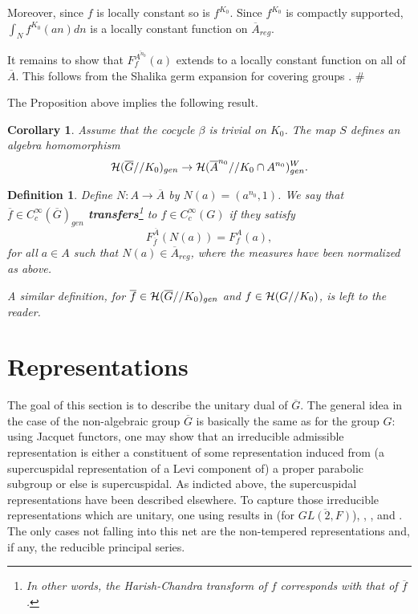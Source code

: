 \documentclass[twocolumn,10pt]{article}
\newtheorem{corollary}[theorem]{Corollary}
\newtheorem{definition}[theorem]{Definition}
\begin{document}
Moreover, since $f$ is locally constant so is $f^{K_0}$. 
Since $f^{K_0}$ is
compactly supported, $\int_Nf^{K_0}(an)dn$ is a locally 
constant function on 
$\overline{A}_{reg}$.

It remains to show that $F_f^{\overline{A^{n_0}}}(a)$ 
extends to a locally constant
function on all of $\overline{A}$. This follows from 
the Shalika germ expansion for covering groups \cite{V}.
 $\# $

The Proposition above implies the following result.

\begin{corollary}
Assume that the cocycle $\beta$ is trivial on $K_0$.
The map $S$ defines an algebra homomorphism
\[
{\cal H}(\overline{G}//K_0)_{gen}
\rightarrow 
{\cal H}(\overline{A}^{n_0}//K_0\cap A^{n_0})^W_{gen}.
\]
\label{cor:main1}
\end{corollary}

\begin{definition} 
Define $N:A\rightarrow \overline{A}$
by $N(a)=(a^{n_0},1)$. We say that
$\overline{f}\in C_c^\infty (\overline{G})_{gen}$
{\bf transfers}\footnote{In other words, the Harish-Chandra
transform of $f$ corresponds with that of $\overline{f}$.}
 to $f\in C_c^\infty(G)$ if
they satisfy
\[
F_{\overline{f}}^{\overline{A}}(N(a))=F_{f}^{A}(a),
\]
for all $a\in A$ such that $N(a)\in \overline{A}_{reg}$,
where the measures have been normalized as above.

A similar definition, for 
$\overline{f}\in {\cal H}(\overline{G}//K_0)_{gen}$
and $f\in {\cal H}(G//K_0)$, is left to the reader.
\label{defn:transfer}
\end{definition}

\section{Representations}

The goal of this section is to describe
the unitary dual of $\overline{G}$.
The general idea in the case of the non-algebraic
group $\overline{G}$ is basically the same as
for the group $G$: using Jacquet functors, one may
show that an irreducible admissible representation 
is either a constituent of some 
representation induced from 
(a supercuspidal representation
of a Levi component of) a proper parabolic subgroup
or else is supercuspidal. As indicted above, the supercuspidal
representations have been described elsewhere.
To capture those irreducible representations 
which are unitary, one using results in
\cite{FK} (for $\overline{GL(2,F)}$), \cite{Mo1},
\cite{Mo2}, and \cite{Ar}. The only cases not falling
into this net are the non-tempered representations
and, if any, the reducible principal series.
\end{document}
